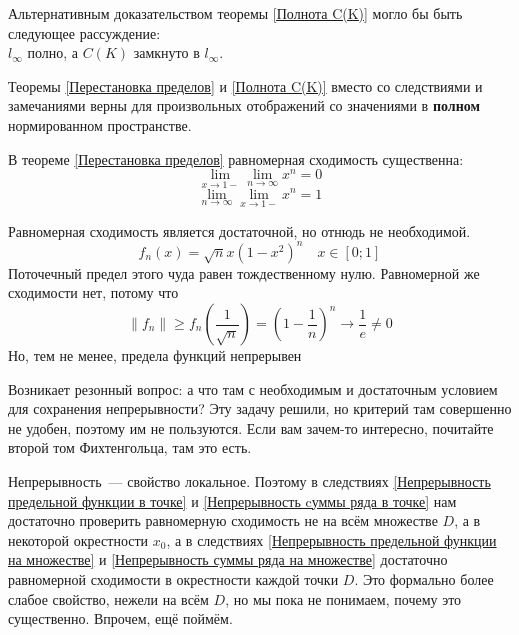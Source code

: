 \documentclass{article}
\begin{document}
    \begin{remark}
        Альтернативным доказательством теоремы \ref{Полнота C(K)} могло бы быть следующее рассуждение:\\
        $l_\infty$ полно, а $C(K)$ замкнуто в $l_\infty$.
    \end{remark}
    \begin{remark}
        Теоремы \ref{Перестановка пределов} и \ref{Полнота C(K)} вместо со следствиями и замечаниями верны для произвольных отображений со значениями в \textbf{полном} нормированном пространстве.
    \end{remark}
    \begin{example}
        В теореме \ref{Перестановка пределов} равномерная сходимость существенна:
        $$
        \lim\limits_{x\to 1-}\lim\limits_{n\to\infty}x^n=0
        $$
        $$
        \lim\limits_{n\to\infty}\lim\limits_{x\to 1-}x^n=1
        $$
    \end{example}
    \begin{example}
        Равномерная сходимость является достаточной, но отнюдь не необходимой.
        $$
        f_n(x)=\sqrt nx(1-x^2)^n\quad x\in[0;1]
        $$
        Поточечный предел этого чуда равен тождественному нулю. Равномерной же сходимости нет, потому что
        $$
        \|f_n\|\geqslant f_n\left(\frac1{\sqrt n}\right)=\left(1-\frac1n\right)^n\to\frac1e\neq0
        $$
        Но, тем не менее, предела функций непрерывен
    \end{example}
    \begin{remark}
        Возникает резонный вопрос: а что там с необходимым и достаточным условием для сохранения непрерывности? Эту задачу решили, но критерий там совершенно не удобен, поэтому им не пользуются. Если вам зачем-то интересно, почитайте второй том Фихтенгольца, там это есть.
    \end{remark}
    \begin{remark}
        Непрерывность~--- свойство локальное. Поэтому в следствиях \ref{Непрерывность предельной функции в точке} и \ref{Непрерывность cуммы ряда в точке} нам достаточно проверить равномерную сходимость не на всём множестве $D$, а в некоторой окрестности $x_0$, а в следствиях \ref{Непрерывность предельной функции на множестве} и \ref{Непрерывность суммы ряда на множестве} достаточно равномерной сходимости в окрестности каждой точки $D$. Это формально более слабое свойство, нежели на всём $D$, но мы пока не понимаем, почему это существенно. Впрочем, ещё поймём.
    \end{remark}
\end{document}
